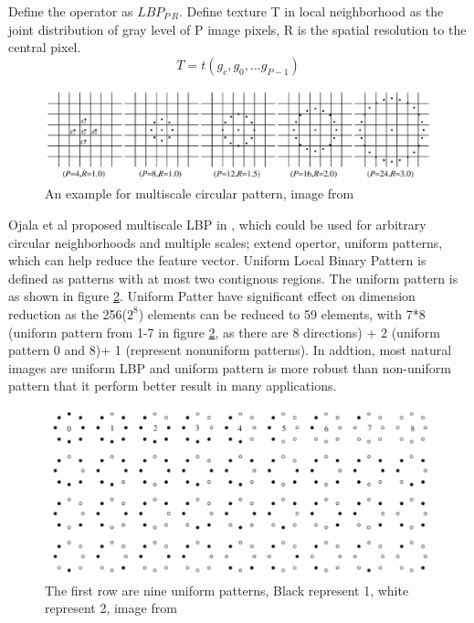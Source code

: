 \newline
Define the operator as $LBP_{P\ R}$. Define texture T in local neighborhood as the joint distribution of gray level of P image pixels, R is the spatial resolution to the central pixel.
\begin{equation}
T = t(g_{c},g_{0},...g_{P-1})
\label{eq:LBPDT}
\end{equation}
\begin{figure}[ht]
\centering
\captionsetup{justification=centering,margin=1cm}
\includegraphics[width = \textwidth]{imgs/LBP_Example_3.png}
\caption{An example for multiscale circular pattern, image from \cite{ojala2002multiresolution}}
\label{fig:LBPE03}
\end{figure}

Ojala et al proposed multiscale LBP in \cite{ojala2002multiresolution}, which could be used for arbitrary circular neighborhoods and multiple scales; extend opertor, uniform patterns, which can help reduce the feature vector. Uniform Local Binary Pattern is defined as patterns with at most two contignous regions. The uniform pattern is as shown in figure \ref{fig:LBPE04}. Uniform Patter have significant effect on dimension reduction as the 256($2^8$) elements can be reduced to 59 elements, with 7*8 (uniform pattern from 1-7 in figure \ref{fig:LBPE04}, as there are 8 directions) + 2 (uniform pattern 0 and 8)+ 1 (represent nonuniform patterns). In addtion, most natural images are uniform LBP and uniform pattern is more robust than non-uniform pattern that it perform better result in many applications.
\begin{figure}[ht]
\centering
\captionsetup{justification=centering,margin=1cm}
\includegraphics[width = \textwidth]{imgs/LBP_Example_4.png}
\caption{The first row are nine uniform patterns, Black represent 1, white represent 2, image from \cite{ojala2002multiresolution}}
\label{fig:LBPE04}
\end{figure}
\newpage
